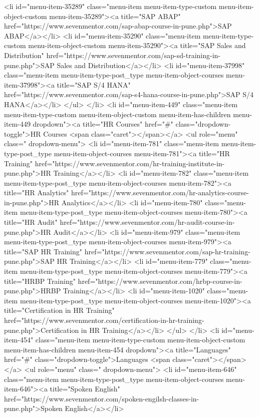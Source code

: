 {<li id="menu-item-35289" class="menu-item menu-item-type-custom menu-item-object-custom menu-item-35289"><a title="SAP ABAP" href="https://www.sevenmentor.com/sap-abap-course-in-pune.php">SAP ABAP</a></li>
<li id="menu-item-35290" class="menu-item menu-item-type-custom menu-item-object-custom menu-item-35290"><a title="SAP Sales and Distribution" href="https://www.sevenmentor.com/sap-sd-training-in-pune.php">SAP Sales and Distribution</a></li>
<li id="menu-item-37998" class="menu-item menu-item-type-post_type menu-item-object-courses menu-item-37998"><a title="SAP S/4 HANA" href="https://www.sevenmentor.com/sap-s4-hana-course-in-pune.php">SAP S/4 HANA</a></li>
</ul>
</li>
<li id="menu-item-449" class="menu-item menu-item-type-custom menu-item-object-custom menu-item-has-children menu-item-449 dropdown"><a title="HR Courses" href="#" class="dropdown-toggle">HR Courses <span class="caret"></span></a>
<ul role="menu" class=" dropdown-menu">
<li id="menu-item-781" class="menu-item menu-item-type-post_type menu-item-object-courses menu-item-781"><a title="HR Training" href="https://www.sevenmentor.com/hr-training-institute-in-pune.php">HR Training</a></li>
<li id="menu-item-782" class="menu-item menu-item-type-post_type menu-item-object-courses menu-item-782"><a title="HR Analytics" href="https://www.sevenmentor.com/hr-analytics-course-in-pune.php">HR Analytics</a></li>
<li id="menu-item-780" class="menu-item menu-item-type-post_type menu-item-object-courses menu-item-780"><a title="HR Audit" href="https://www.sevenmentor.com/hr-audit-course-in-pune.php">HR Audit</a></li>
<li id="menu-item-979" class="menu-item menu-item-type-post_type menu-item-object-courses menu-item-979"><a title="SAP HR Training" href="https://www.sevenmentor.com/sap-hr-training-pune.php">SAP HR Training</a></li>
<li id="menu-item-779" class="menu-item menu-item-type-post_type menu-item-object-courses menu-item-779"><a title="HRBP Training" href="https://www.sevenmentor.com/hrbp-course-in-pune.php">HRBP Training</a></li>
<li id="menu-item-1020" class="menu-item menu-item-type-post_type menu-item-object-courses menu-item-1020"><a title="Certification in HR Training" href="https://www.sevenmentor.com/certification-in-hr-training-pune.php">Certification in HR Training</a></li>
</ul>
</li>
<li id="menu-item-454" class="menu-item menu-item-type-custom menu-item-object-custom menu-item-has-children menu-item-454 dropdown"><a title="Languages" href="#" class="dropdown-toggle">Languages <span class="caret"></span></a>
<ul role="menu" class=" dropdown-menu">
<li id="menu-item-646" class="menu-item menu-item-type-post_type menu-item-object-courses menu-item-646"><a title="Spoken English" href="https://www.sevenmentor.com/spoken-engilsh-classes-in-pune.php">Spoken English</a></li>
}
